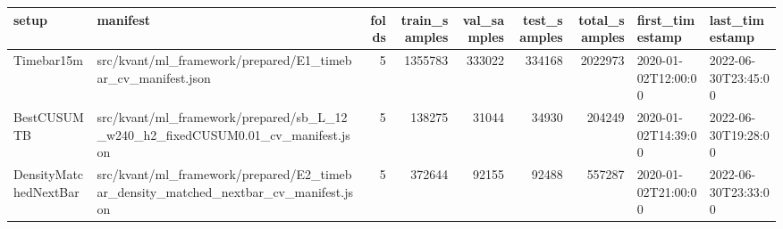 \begin{tabular}{llrrrrrll}
\toprule
setup & manifest & folds & train\_samples & val\_samples & test\_samples & total\_samples & first\_timestamp & last\_timestamp \\
\midrule
Timebar15m & src/kvant/ml\_framework/prepared/E1\_timebar\_cv\_manifest.json & 5 & 1355783 & 333022 & 334168 & 2022973 & 2020-01-02T12:00:00 & 2022-06-30T23:45:00 \\
BestCUSUMTB & src/kvant/ml\_framework/prepared/sb\_L\_12\_w240\_h2\_fixedCUSUM0.01\_cv\_manifest.json & 5 & 138275 & 31044 & 34930 & 204249 & 2020-01-02T14:39:00 & 2022-06-30T19:28:00 \\
DensityMatchedNextBar & src/kvant/ml\_framework/prepared/E2\_timebar\_density\_matched\_nextbar\_cv\_manifest.json & 5 & 372644 & 92155 & 92488 & 557287 & 2020-01-02T21:00:00 & 2022-06-30T23:33:00 \\
\bottomrule
\end{tabular}
